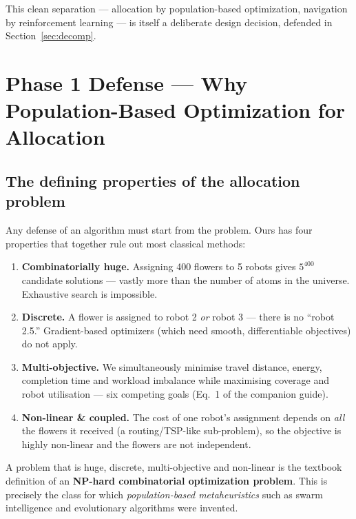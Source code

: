 \documentclass[11pt]{article}
\begin{document}
This clean separation --- allocation by population-based optimization, navigation
by reinforcement learning --- is itself a deliberate design decision, defended in
Section~\ref{sec:decomp}.

\section{Phase 1 Defense --- Why Population-Based Optimization for Allocation}

\subsection{The defining properties of the allocation problem}
Any defense of an algorithm must start from the problem. Ours has four
properties that together rule out most classical methods:

\begin{enumerate}[leftmargin=1.5em]
  \item \textbf{Combinatorially huge.} Assigning 400 flowers to 5 robots gives
        $5^{400}$ candidate solutions --- vastly more than the number of atoms in
        the universe. Exhaustive search is impossible.
  \item \textbf{Discrete.} A flower is assigned to robot 2 \emph{or} robot 3 ---
        there is no ``robot 2.5.'' Gradient-based optimizers (which need smooth,
        differentiable objectives) do not apply.
  \item \textbf{Multi-objective.} We simultaneously minimise travel distance,
        energy, completion time and workload imbalance while maximising coverage
        and robot utilisation --- six competing goals (Eq.~1 of the companion
        guide).
  \item \textbf{Non-linear \& coupled.} The cost of one robot's assignment
        depends on \emph{all} the flowers it received (a routing/TSP-like
        sub-problem), so the objective is highly non-linear and the flowers are
        not independent.
\end{enumerate}

\begin{claim}
A problem that is huge, discrete, multi-objective and non-linear is the textbook
definition of an \textbf{NP-hard combinatorial optimization problem}. This is
precisely the class for which \emph{population-based metaheuristics} such as
swarm intelligence and evolutionary algorithms were invented.
\end{claim}
\end{document}
